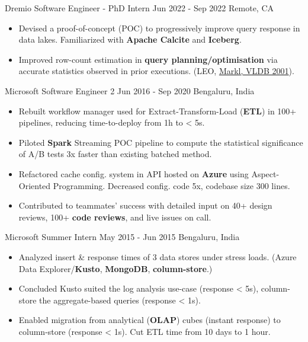 \newcommand{\makework}[6]{
    \expandafter\def\csname work#1\endcsname{#2}
    \expandafter\def\csname title#1\endcsname{#3}
    \expandafter\def\csname time#1\endcsname{#4}
    \expandafter\def\csname place#1\endcsname{#5}
    \expandafter\def\csname detail#1\endcsname{#6}
}

\makework{dremio}
    {Dremio}
    {Software Engineer - PhD Intern}
    {Jun 2022 - Sep 2022}
    {Remote, CA}
    {
    \begin{itemize}
        \item Devised a proof-of-concept (POC) to progressively improve query response in data lakes. Familiarized with \textbf{Apache Calcite} and \textbf{Iceberg}.
        
        \item Improved row-count estimation in \textbf{query planning/optimisation} via accurate statistics observed in prior executions. 
        (LEO, \href{https://www.vldb.org/conf/2001/P019.pdf}{Markl, VLDB 2001}).%
    \end{itemize}
    }

\makework{microsoft}
    {Microsoft}
    {Software Engineer 2}
    {Jun 2016 - Sep 2020}
    {Bengaluru, India}
    {
    \begin{itemize}
        \item Rebuilt workflow manager used for Extract-Transform-Load (\textbf{ETL}) in 100+ pipelines, reducing time-to-deploy from 1h to < 5s. 
        \item Piloted \textbf{Spark} Streaming POC pipeline to compute the statistical significance of A/B tests 3x faster than existing batched method.
        \item Refactored cache config. system in API hosted on \textbf{Azure} using Aspect-Oriented Programming. Decreased config. code 5x, codebase size 300 lines. 
        \item Contributed to teammates' success with detailed input on 40+ design reviews, 100+ \textbf{code reviews}, and live issues on call.
    \end{itemize}
    }

\makework{internmicrosoft}
    {Microsoft}
    {Summer Intern}
    {May 2015 - Jun 2015}
    {Bengaluru, India}
    {
    \begin{itemize}
        \item Analyzed insert \& response times of 3 data stores under stress loads.
        (Azure Data Explorer/\textbf{Kusto}, \textbf{MongoDB}, \textbf{column-store}.)

        \item Concluded Kusto suited the log analysis use-case (response < 5s), column-store the aggregate-based queries (response < 1s). 

        \item Enabled migration from analytical (\textbf{OLAP}) cubes (instant response) to column-store (response < 1s). Cut ETL time from 10 days to 1 hour. 
    \end{itemize}
    }

